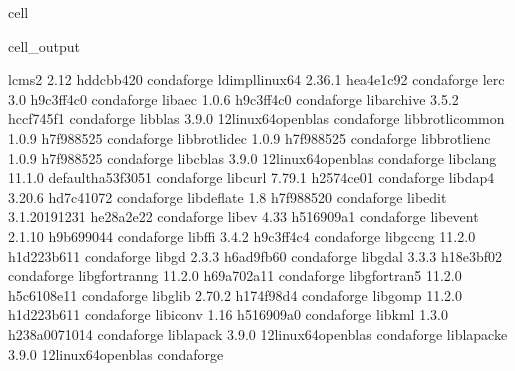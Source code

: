 \documentclass[letterpaper,table,10pt,english]{jupyterBook}
\begin{document}
\begin{sphinxuseclass}{cell}
\begin{sphinxVerbatimOutput}
\begin{sphinxuseclass}{cell_output}
\begin{sphinxVerbatim}[commandchars=\\\{\}]
lcms2                     2.12                 hddcbb42\PYGZus{}0    conda\PYGZhy{}forge
ld\PYGZus{}impl\PYGZus{}linux\PYGZhy{}64          2.36.1               hea4e1c9\PYGZus{}2    conda\PYGZhy{}forge
lerc                      3.0                  h9c3ff4c\PYGZus{}0    conda\PYGZhy{}forge
libaec                    1.0.6                h9c3ff4c\PYGZus{}0    conda\PYGZhy{}forge
libarchive                3.5.2                hccf745f\PYGZus{}1    conda\PYGZhy{}forge
libblas                   3.9.0           12\PYGZus{}linux64\PYGZus{}openblas    conda\PYGZhy{}forge
libbrotlicommon           1.0.9                h7f98852\PYGZus{}5    conda\PYGZhy{}forge
libbrotlidec              1.0.9                h7f98852\PYGZus{}5    conda\PYGZhy{}forge
libbrotlienc              1.0.9                h7f98852\PYGZus{}5    conda\PYGZhy{}forge
libcblas                  3.9.0           12\PYGZus{}linux64\PYGZus{}openblas    conda\PYGZhy{}forge
libclang                  11.1.0          default\PYGZus{}ha53f305\PYGZus{}1    conda\PYGZhy{}forge
libcurl                   7.79.1               h2574ce0\PYGZus{}1    conda\PYGZhy{}forge
libdap4                   3.20.6               hd7c4107\PYGZus{}2    conda\PYGZhy{}forge
libdeflate                1.8                  h7f98852\PYGZus{}0    conda\PYGZhy{}forge
libedit                   3.1.20191231         he28a2e2\PYGZus{}2    conda\PYGZhy{}forge
libev                     4.33                 h516909a\PYGZus{}1    conda\PYGZhy{}forge
libevent                  2.1.10               h9b69904\PYGZus{}4    conda\PYGZhy{}forge
libffi                    3.4.2                h9c3ff4c\PYGZus{}4    conda\PYGZhy{}forge
libgcc\PYGZhy{}ng                 11.2.0              h1d223b6\PYGZus{}11    conda\PYGZhy{}forge
libgd                     2.3.3                h6ad9fb6\PYGZus{}0    conda\PYGZhy{}forge
libgdal                   3.3.3                h18e3bf0\PYGZus{}2    conda\PYGZhy{}forge
libgfortran\PYGZhy{}ng            11.2.0              h69a702a\PYGZus{}11    conda\PYGZhy{}forge
libgfortran5              11.2.0              h5c6108e\PYGZus{}11    conda\PYGZhy{}forge
libglib                   2.70.2               h174f98d\PYGZus{}4    conda\PYGZhy{}forge
libgomp                   11.2.0              h1d223b6\PYGZus{}11    conda\PYGZhy{}forge
libiconv                  1.16                 h516909a\PYGZus{}0    conda\PYGZhy{}forge
libkml                    1.3.0             h238a007\PYGZus{}1014    conda\PYGZhy{}forge
liblapack                 3.9.0           12\PYGZus{}linux64\PYGZus{}openblas    conda\PYGZhy{}forge
liblapacke                3.9.0           12\PYGZus{}linux64\PYGZus{}openblas    conda\PYGZhy{}forge

\end{sphinxVerbatim}
\end{sphinxuseclass}
\end{sphinxVerbatimOutput}
\end{sphinxuseclass}
\end{document}
